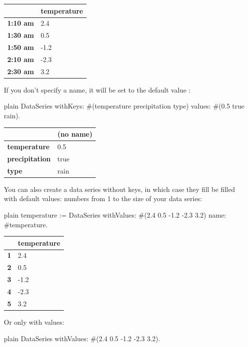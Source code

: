 \documentclass[10pt,twoside,english]{_support/latex/sbabook/sbabook}
\begin{document}
\begin{tabular}{ll}
\toprule
 & \textbf{temperature} \\
\midrule
\textbf{1:10 am} & 2.4 \\
\textbf{1:30 am} & 0.5 \\
\textbf{1:50 am} & -1.2 \\
\textbf{2:10 am} & -2.3 \\
\textbf{2:30 am} & 3.2 \\
\bottomrule
\end{tabular}

If you don't specify a name, it will be set to the default value :

\begin{displaycode}{plain}
DataSeries
  withKeys: #(temperature precipitation type)
  values: #(0.5 true rain).
\end{displaycode}

\begin{tabular}{ll}
\toprule
 & \textbf{(no name)} \\
\midrule
\textbf{temperature} & 0.5 \\
\textbf{precipitation} & true \\
\textbf{type} & rain \\
\bottomrule
\end{tabular}

You can also create a data series without keys, in which case they fill be filled with default values: numbers from 1 to the size of your data series:

\begin{displaycode}{plain}
temperature := DataSeries
  withValues: #(2.4 0.5 -1.2 -2.3 3.2)
  name: #temperature.
\end{displaycode}

\begin{tabular}{ll}
\toprule
 & \textbf{temperature} \\
\midrule
\textbf{1} & 2.4 \\
\textbf{2} & 0.5 \\
\textbf{3} & -1.2 \\
\textbf{4} & -2.3 \\
\textbf{5} & 3.2 \\
\bottomrule
\end{tabular}

Or only with values:

\begin{displaycode}{plain}
DataSeries
  withValues: #(2.4 0.5 -1.2 -2.3 3.2).
\end{displaycode}
\end{document}
